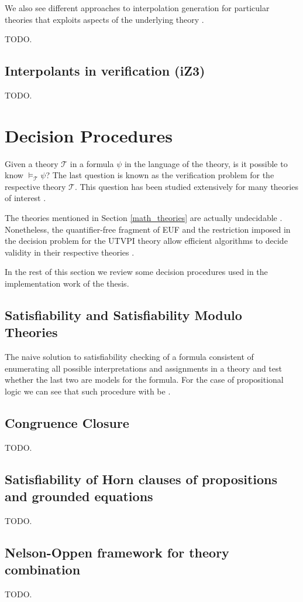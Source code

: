 We also see different approaches to interpolation generation for particular
theories that exploits aspects of the underlying theory
\cite{10.1007/978-3-540-69738-1_25, 10.1007/11814771_21}.

TODO.

\subsection{Interpolants in verification (iZ3)}


TODO.

\section{Decision Procedures}

Given a theory $\mathcal{T}$ in a formula $\psi$ in 
the language of the theory, is it possible to know $\models_{\mathcal{T}} \psi$? 
The last question is known as the verification problem for the respective
theory $\mathcal{T}$. This question has been studied extensively 
for many theories of interest \cite{borger2001classical}. 

The theories mentioned in Section \ref{math_theories} are actually 
undecidable \cite{borger2001classical, DBLP:books/daglib/0076838}.
Nonetheless, the quantifier-free fragment of EUF and the restriction 
imposed in the decision problem for the UTVPI theory allow efficient
algorithms to decide validity in their respective theories 
\cite{10.1145/322186.322198, 10.1145/322217.322228, 10.1007/11559306_9}.

In the rest of this section we review some decision procedures used in
the implementation work of the thesis.

\subsection{Satisfiability and Satisfiability Modulo Theories}
 
The naive solution to satisfiability checking of a formula
consistent of enumerating all possible interpretations 
and assignments in a theory and test whether the last two are 
models for the formula. For the case of propositional logic 
we can see that such procedure with be .

\subsection{Congruence Closure}

TODO.

\subsection{Satisfiability of Horn clauses of propositions and grounded equations}

TODO.

\subsection{Nelson-Oppen framework for theory combination}


TODO.

